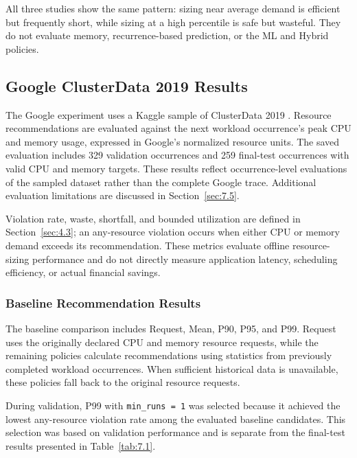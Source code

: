 \documentclass{IEEEtran}
\begin{document}
All three studies show the same pattern: sizing near average demand is efficient but frequently short, while sizing at a high percentile is safe but wasteful. They do not evaluate memory, recurrence-based prediction, or the ML and Hybrid policies.

\subsection{Google ClusterData 2019 Results}\label{sec:7.2}

The Google experiment uses a Kaggle sample of ClusterData 2019 \cite{ref7}. Resource recommendations are evaluated against the next workload occurrence's peak CPU and memory usage, expressed in Google's normalized resource units. The saved evaluation includes 329 validation occurrences and 259 final-test occurrences with valid CPU and memory targets. These results reflect occurrence-level evaluations of the sampled dataset rather than the complete Google trace. Additional evaluation limitations are discussed in Section~\ref{sec:7.5}.

Violation rate, waste, shortfall, and bounded utilization are defined in Section~\ref{sec:4.3}; an any-resource violation occurs when either CPU or memory demand exceeds its recommendation. These metrics evaluate offline resource-sizing performance and do not directly measure application latency, scheduling efficiency, or actual financial savings.

\subsubsection{Baseline Recommendation Results}\label{sec:7.2.1}

The baseline comparison includes Request, Mean, P90, P95, and P99. Request uses the originally declared CPU and memory resource requests, while the remaining policies calculate recommendations using statistics from previously completed workload occurrences. When sufficient historical data is unavailable, these policies fall back to the original resource requests.

During validation, P99 with \texttt{min\_runs\ =\ 1} was selected because it achieved the lowest any-resource violation rate among the evaluated baseline candidates. This selection was based on validation performance and is separate from the final-test results presented in Table~\ref{tab:7.1}.
\end{document}
